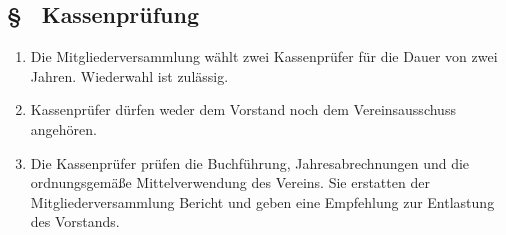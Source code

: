 \subsection{§ \thesaparagraphcounter\ Kassenprüfung} \label{sa:par:kassenpruefung}
\begin{enumerate}
    \item \label{sa:abs:oc03x9} Die Mitgliederversammlung wählt zwei Kassenprüfer für die Dauer von zwei Jahren. Wiederwahl ist zulässig.

    \item \label{sa:abs:h64u0c} Kassenprüfer dürfen weder dem Vorstand noch dem Vereinsausschuss angehören.

    \item \label{sa:abs:jsti40} Die Kassenprüfer prüfen die Buchführung, Jahresabrechnungen und die ordnungsgemäße Mittelverwendung des Vereins. Sie erstatten der Mitgliederversammlung Bericht und geben eine Empfehlung zur Entlastung des Vorstands.
\end{enumerate}


